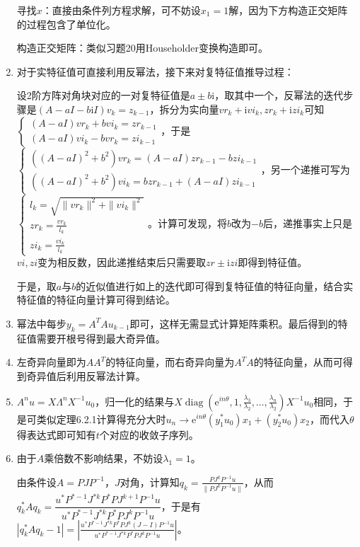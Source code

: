 \documentclass[a4paper,UTF8,fontset=windows]{ctexart}
\DeclareMathOperator{\diag}{diag}
\begin{document}
\begin{enumerate}
寻找$x$：直接由条件列方程求解，可不妨设$x_1=1$解，因为下方构造正交矩阵的过程包含了单位化。

构造正交矩阵：类似习题20用Householder变换构造即可。

\item
对于实特征值可直接利用反幂法，接下来对复特征值推导过程：

设2阶方阵对角块对应的一对复特征值是$a\pm b\mathrm{i}$，取其中一个，反幂法的迭代步骤是$(A-aI-b\mathrm{i}I)v_k=z_{k-1}$，拆分为实向量$vr_k+\mathrm{i}vi_k,zr_k+\mathrm{i}zi_k$可知$\begin{cases}(A-aI)vr_k+bvi_k=zr_{k-1}\\(A-aI)vi_k-bvr_k=zi_{k-1}\end{cases}$，于是$\begin{cases}((A-aI)^2+b^2)vr_k=(A-aI)zr_{k-1}-bzi_{k-1}\\((A-aI)^2+b^2)vi_k=bzr_{k-1}+(A-aI)zi_{k-1}\end{cases}$，另一个递推可写为$\begin{cases}l_k=\sqrt{\|vr_k\|^2+\|vi_k\|^2}\\zr_k=\frac{vr_k}{l_k}\\zi_k=\frac{vi_k}{l_k}\end{cases}$。计算可发现，将$b$改为$-b$后，递推事实上只是$vi,zi$变为相反数，因此递推结束后只需要取$zr\pm\mathrm{i}zi$即得到特征值。

于是，取$a$与$b$的近似值进行如上的迭代即可得到复特征值的特征向量，结合实特征值的特征向量计算可得到结论。

\item
幂法中每步$y_k=A^TAu_{k-1}$即可，这样无需显式计算矩阵乘积。最后得到的特征值需要开根号得到最大奇异值。

\item
左奇异向量即为$AA^T$的特征向量，而右奇异向量为$A^TA$的特征向量，从而可得到奇异值后利用反幂法计算。

\item
$A^nu=X\Lambda^n X^{-1}u_0$，归一化的结果与$X\diag(\mathrm{e}^{in\theta},1,\frac{\lambda_3}{\lambda_2},\dots,\frac{\lambda_n}{\lambda_2})X^{-1}u_0$相同，于是可类似定理6.2.1计算得充分大时$u_n\to\mathrm{e}^{in\theta}(y_1^*u_0)x_1+(y_2^*u_0)x_2$，而代入$\theta$得表达式即可知有$t$个对应的收敛子序列。

\item
由于$A$乘倍数不影响结果，不妨设$\lambda_1=1$。

由条件设$A=PJP^{-1}$，$J$对角，计算知$q_k=\frac{PJ^kP^{-1}u}{\|PJ^kP^{-1}u\|}$，从而$q_k^*Aq_k=\dfrac{u^*P^{*-1}J^{*k}P^*PJ^{k+1}P^{-1}u}{u^*P^{*-1}J^{*k}P^*PJ^kP^{-1}u}$，于是有$|q_k^*Aq_k-1|=\left|\frac{u^*P^{*-1}J^{*k}P^*PJ^k(J-I)P^{-1}u}{u^*P^{*-1}J^{*k}P^*PJ^kP^{-1}u}\right|$。


\end{enumerate}
\end{document}
